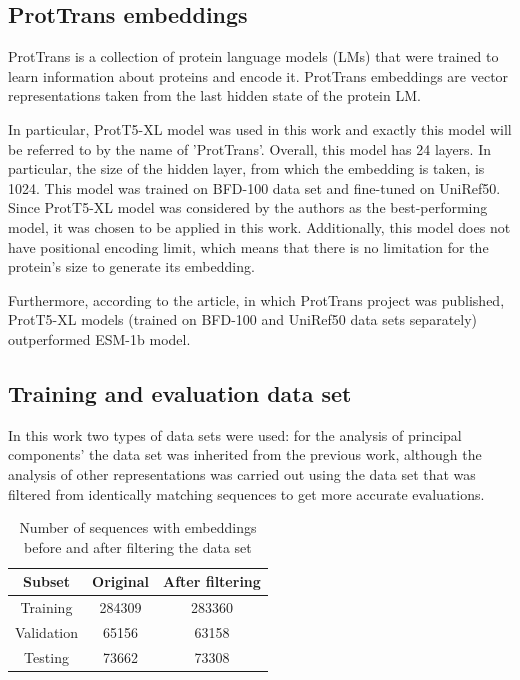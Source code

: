 \documentclass[12pt]{article}
\begin{document}
	\subsection{ProtTrans embeddings}

	ProtTrans \cite{elnaggar2020prottrans} is a collection 
	of protein language models 
	(LMs) that were trained to learn information about 
	proteins and encode it. ProtTrans embeddings are vector 
	representations taken from the last hidden state of 
	the protein LM. 

	In particular, ProtT5-XL model was used in this work and 
	exactly this model will be referred to by the name of 
	'ProtTrans'. Overall, this model has 24 layers. In particular, 
	the size of the hidden layer, from which the 
	embedding is taken, is 1024. This model was trained on 
	BFD-100 data set 
	and fine-tuned on UniRef50. Since ProtT5-XL model was 
	considered by the 
	authors as the best-performing model, it was chosen to be 
	applied in this work. Additionally, this model 
	does not have 
	positional encoding limit, which means that there is no 
	limitation for the protein's size to generate its embedding. 

	Furthermore, according to the article, in which ProtTrans
	project was published, ProtT5-XL models (trained on BFD-100 
	and UniRef50 data sets separately) 
	outperformed ESM-1b \cite{rives2021biological} model.

	\subsection{Training and evaluation data set}

	In this work two types of data sets were used: for the analysis of 
	principal components' the data set was inherited from the previous 
	work, although the analysis of other representations was carried 
	out using the data set that was filtered from identically matching 
	sequences to get more accurate evaluations.

	\begin{table}[h!]
		\caption{Number of sequences with embeddings before and after 
		filtering the data set}
		\vspace{0.2cm}
		\centering
		\begin{tabular}{ | c | c c | }
			\hline 
			Subset & Original & After filtering \\
			\hline 
			Training & 284309 & 283360 \\
			Validation & 65156 & 63158 \\
			Testing & 73662 & 73308 \\
			\hline    
		\end{tabular}
		\label{table:numberEmbeddings}
	\end{table}
\end{document}
